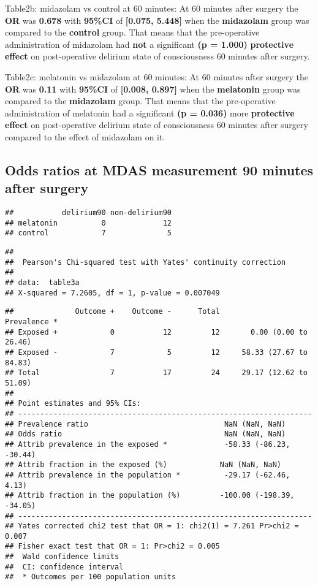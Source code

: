 \documentclass[
]{article}
\begin{document}
Table2b: midazolam vs control at 60 minutes: At 60 minutes after surgery
the \textbf{OR} was \textbf{0.678} with \textbf{95\%CI} of
\textbf{{[}0.075, 5.448{]}} when the \textbf{midazolam} group was
compared to the \textbf{control} group. That means that the
pre-operative administration of midazolam had \textbf{not} a significant
\textbf{(p = 1.000)} \textbf{protective effect} on post-operative
delirium state of consciousness 60 minutes after surgery.

Table2c: melatonin vs midazolam at 60 minutes: At 60 minutes after
surgery the \textbf{OR} was \textbf{0.11} with \textbf{95\%CI} of
\textbf{{[}0.008, 0.897{]}} when the \textbf{melatonin} group was
compared to the \textbf{midazolam} group. That means that the
pre-operative administration of melatonin had a significant \textbf{(p =
0.036)} more \textbf{protective effect} on post-operative delirium state
of consciousness 60 minutes after surgery compared to the effect of
midazolam on it.

\hypertarget{odds-ratios-at-mdas-measurement-90-minutes-after-surgery}{%
\subsection{Odds ratios at MDAS measurement 90 minutes after
surgery}\label{odds-ratios-at-mdas-measurement-90-minutes-after-surgery}}

\begin{verbatim}
##           delirium90 non-delirium90
## melatonin          0             12
## control            7              5
\end{verbatim}

\begin{verbatim}
## 
##  Pearson's Chi-squared test with Yates' continuity correction
## 
## data:  table3a
## X-squared = 7.2605, df = 1, p-value = 0.007049
\end{verbatim}

\begin{verbatim}
##              Outcome +    Outcome -      Total               Prevalence *
## Exposed +            0           12         12       0.00 (0.00 to 26.46)
## Exposed -            7            5         12     58.33 (27.67 to 84.83)
## Total                7           17         24     29.17 (12.62 to 51.09)
## 
## Point estimates and 95% CIs:
## -------------------------------------------------------------------
## Prevalence ratio                               NaN (NaN, NaN)
## Odds ratio                                     NaN (NaN, NaN)
## Attrib prevalence in the exposed *             -58.33 (-86.23, -30.44)
## Attrib fraction in the exposed (%)            NaN (NaN, NaN)
## Attrib prevalence in the population *          -29.17 (-62.46, 4.13)
## Attrib fraction in the population (%)         -100.00 (-198.39, -34.05)
## -------------------------------------------------------------------
## Yates corrected chi2 test that OR = 1: chi2(1) = 7.261 Pr>chi2 = 0.007
## Fisher exact test that OR = 1: Pr>chi2 = 0.005
##  Wald confidence limits
##  CI: confidence interval
##  * Outcomes per 100 population units
\end{verbatim}
\end{document}
